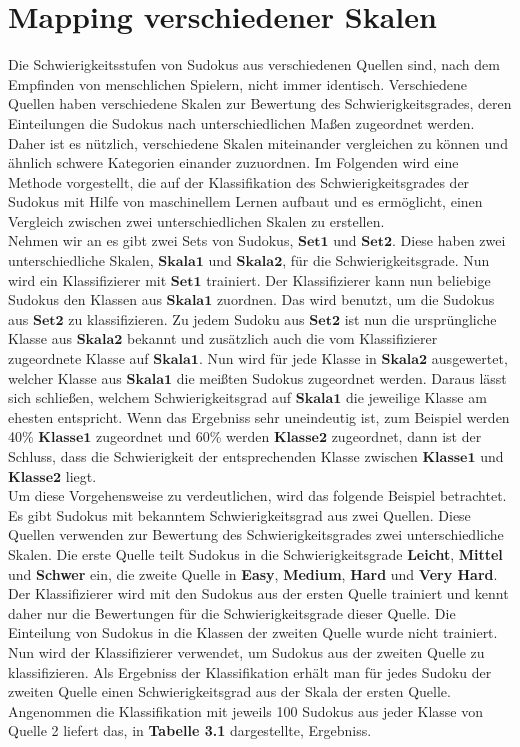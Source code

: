 \newpage
\section{Mapping verschiedener Skalen}
Die Schwierigkeitsstufen von Sudokus aus verschiedenen Quellen sind, nach dem Empfinden von menschlichen Spielern, nicht immer identisch. Verschiedene Quellen haben verschiedene Skalen zur Bewertung des Schwierigkeitsgrades, deren Einteilungen die Sudokus nach unterschiedlichen Maßen zugeordnet werden. Daher ist es nützlich, verschiedene Skalen miteinander vergleichen zu können und ähnlich schwere Kategorien einander zuzuordnen. Im Folgenden wird eine Methode vorgestellt, die auf der Klassifikation des Schwierigkeitsgrades der Sudokus mit Hilfe von maschinellem Lernen aufbaut und es ermöglicht, einen Vergleich zwischen zwei unterschiedlichen Skalen zu erstellen.\\
Nehmen wir an es gibt zwei Sets von Sudokus, $\mathbf{Set 1}$ und $\mathbf{Set 2}$. Diese haben zwei unterschiedliche Skalen, $\mathbf{Skala 1}$ und $\mathbf{Skala 2}$, für die Schwierigkeitsgrade. Nun wird ein Klassifizierer mit $\mathbf{Set 1}$ trainiert. Der Klassifizierer kann nun beliebige Sudokus den Klassen aus $\mathbf{Skala 1}$ zuordnen. Das wird benutzt, um die Sudokus aus $\mathbf{Set 2}$ zu klassifizieren. Zu jedem Sudoku aus $\mathbf{Set 2}$ ist nun die ursprüngliche Klasse aus $\mathbf{Skala 2}$ bekannt und zusätzlich auch die vom Klassifizierer zugeordnete Klasse auf $\mathbf{Skala 1}$. Nun wird für jede Klasse in $\mathbf{Skala 2}$ ausgewertet, welcher Klasse aus $\mathbf{Skala 1}$ die meißten Sudokus zugeordnet werden. Daraus lässt sich schließen, welchem Schwierigkeitsgrad auf $\mathbf{Skala 1}$ die jeweilige Klasse am ehesten entspricht. Wenn das Ergebniss sehr uneindeutig ist, zum Beispiel werden 40\% $\mathbf{Klasse 1}$ zugeordnet und 60\% werden $\mathbf{Klasse 2}$ zugeordnet, dann ist der Schluss, dass die Schwierigkeit der entsprechenden Klasse zwischen $\mathbf{Klasse 1}$ und $\mathbf{Klasse 2}$ liegt.\\
Um diese Vorgehensweise zu verdeutlichen, wird das folgende Beispiel betrachtet. Es gibt Sudokus mit bekanntem Schwierigkeitsgrad aus zwei Quellen. Diese Quellen verwenden zur Bewertung des Schwierigkeitsgrades zwei unterschiedliche Skalen. Die erste Quelle teilt Sudokus in die Schwierigkeitsgrade \textbf{Leicht}, \textbf{Mittel} und \textbf{Schwer} ein, die zweite Quelle in \textbf{Easy}, \textbf{Medium}, \textbf{Hard} und \textbf{Very Hard}. Der Klassifizierer wird mit den Sudokus aus der ersten Quelle trainiert und kennt daher nur die Bewertungen für die Schwierigkeitsgrade dieser Quelle. Die Einteilung von Sudokus in die Klassen der zweiten Quelle wurde nicht trainiert. Nun wird der Klassifizierer verwendet, um Sudokus aus der zweiten Quelle zu klassifizieren. Als Ergebniss der Klassifikation erhält man für jedes Sudoku der zweiten Quelle einen Schwierigkeitsgrad aus der Skala der ersten Quelle. Angenommen die Klassifikation mit jeweils 100 Sudokus aus jeder Klasse von Quelle 2 liefert das, in \textbf{Tabelle 3.1} dargestellte, Ergebniss.\\
